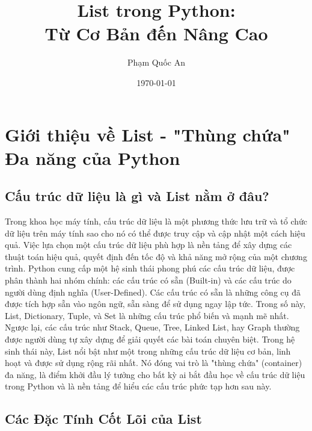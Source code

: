 \documentclass[11pt]{article}
\title{\Huge List trong Python: \\ \Large Từ Cơ Bản đến Nâng Cao}
\author{Phạm Quốc An}
\date{\today}
\begin{document}
\maketitle
\tableofcontents
\newpage

\section{Giới thiệu về List - "Thùng chứa" Đa năng của Python}

\subsection{Cấu trúc dữ liệu là gì và List nằm ở đâu?}

Trong khoa học máy tính, cấu trúc dữ liệu là một phương thức lưu trữ và tổ chức dữ liệu trên máy tính sao cho nó có thể được truy cập và cập nhật một cách hiệu quả. Việc lựa chọn một cấu trúc dữ liệu phù hợp là nền tảng để xây dựng các thuật toán hiệu quả, quyết định đến tốc độ và khả năng mở rộng của một chương trình.
Python cung cấp một hệ sinh thái phong phú các cấu trúc dữ liệu, được phân thành hai nhóm chính: các cấu trúc có sẵn (Built-in) và các cấu trúc do người dùng định nghĩa (User-Defined). Các cấu trúc có sẵn là những công cụ đã được tích hợp sẵn vào ngôn ngữ, sẵn sàng để sử dụng ngay lập tức. Trong số này, List, Dictionary, Tuple, và Set là những cấu trúc phổ biến và mạnh mẽ nhất. Ngược lại, các cấu trúc như Stack, Queue, Tree, Linked List, hay Graph thường được người dùng tự xây dựng để giải quyết các bài toán chuyên biệt.
Trong hệ sinh thái này, List nổi bật như một trong những cấu trúc dữ liệu cơ bản, linh hoạt và được sử dụng rộng rãi nhất. Nó đóng vai trò là "thùng chứa" (container) đa năng, là điểm khởi đầu lý tưởng cho bất kỳ ai bắt đầu học về cấu trúc dữ liệu trong Python và là nền tảng để hiểu các cấu trúc phức tạp hơn sau này.

\subsection{Các Đặc Tính Cốt Lõi của List}
\end{document}
